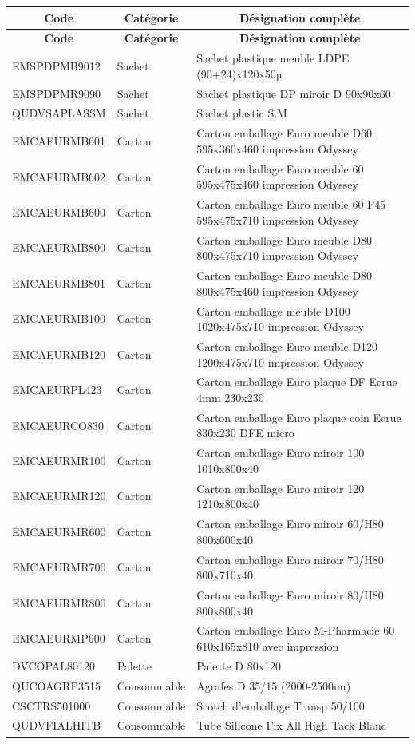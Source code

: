 \documentclass[12pt,a4paper]{article}
\begin{document}
\begin{longtable}{|p{3cm}|p{3cm}|p{8cm}|}
\hline
\multicolumn{1}{|c|}{\textbf{Code}} & \multicolumn{1}{c|}{\textbf{Catégorie}} & \multicolumn{1}{c|}{\textbf{Désignation complète}} \\
\hline
\endfirsthead
\hline
\multicolumn{1}{|c|}{\textbf{Code}} & \multicolumn{1}{c|}{\textbf{Catégorie}} & \multicolumn{1}{c|}{\textbf{Désignation complète}} \\
\hline
\endhead
\hline
\endfoot
EMSPDPMB9012 & Sachet & Sachet plastique meuble LDPE (90+24)x120x50µ \\
EMSPDPMR9090 & Sachet & Sachet plastique DP miroir D 90x90x60 \\
QUDVSAPLASSM & Sachet & Sachet plastic S.M \\
EMCAEURMB601 & Carton & Carton emballage Euro meuble D60 595x360x460 impression Odyssey \\
EMCAEURMB602 & Carton & Carton emballage Euro meuble 60 595x475x460 impression Odyssey \\
EMCAEURMB600 & Carton & Carton emballage Euro meuble 60 F45 595x475x710 impression Odyssey \\
EMCAEURMB800 & Carton & Carton emballage Euro meuble D80 800x475x710 impression Odyssey \\
EMCAEURMB801 & Carton & Carton emballage Euro meuble D80 800x475x460 impression Odyssey \\
EMCAEURMB100 & Carton & Carton emballage meuble D100 1020x475x710 impression Odyssey \\
EMCAEURMB120 & Carton & Carton emballage Euro meuble D120 1200x475x710 impression Odyssey \\
EMCAEURPL423 & Carton & Carton emballage Euro plaque DF Ecrue 4mm 230x230 \\
EMCAEURCO830 & Carton & Carton emballage Euro plaque coin Ecrue 830x230 DFE micro \\
EMCAEURMR100 & Carton & Carton emballage Euro miroir 100 1010x800x40 \\
EMCAEURMR120 & Carton & Carton emballage Euro miroir 120 1210x800x40 \\
EMCAEURMR600 & Carton & Carton emballage Euro miroir 60/H80 800x600x40 \\
EMCAEURMR700 & Carton & Carton emballage Euro miroir 70/H80 800x710x40 \\
EMCAEURMR800 & Carton & Carton emballage Euro miroir 80/H80 800x800x40 \\
EMCAEURMP600 & Carton & Carton emballage Euro M-Pharmacie 60 610x165x810 avec impression \\
DVCOPAL80120 & Palette & Palette D 80x120 \\
QUCOAGRP3515 & Consommable & Agrafes D 35/15 (2000-2500un) \\
CSCTRS501000 & Consommable & Scotch d'emballage Transp 50/100 \\
QUDVFIALHITB & Consommable & Tube Silicone Fix All High Tack Blanc \\
\hline
\end{longtable}
\end{document}
